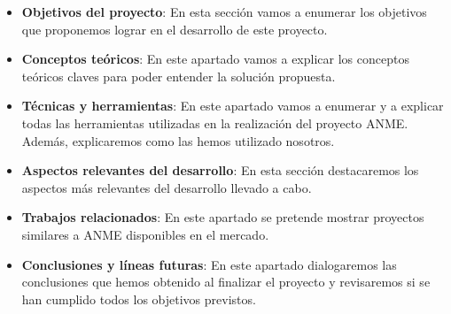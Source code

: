 \begin{itemize}
    \item \textbf{Objetivos del proyecto}: En esta sección vamos a enumerar los objetivos que proponemos lograr en el desarrollo de este proyecto.
    \item \textbf{Conceptos teóricos}: En este apartado vamos a explicar los conceptos teóricos claves para poder entender la solución propuesta.
    \item \textbf{Técnicas y herramientas}: En este apartado vamos a enumerar y a explicar todas las herramientas utilizadas en la realización del proyecto ANME. Además, explicaremos como las hemos utilizado nosotros. 
    \item \textbf{Aspectos relevantes del desarrollo}: En esta sección destacaremos los aspectos más relevantes del desarrollo llevado a cabo.
    \item \textbf{Trabajos relacionados}: En este apartado se pretende mostrar proyectos similares a ANME disponibles en el mercado.
    \item \textbf{Conclusiones y líneas futuras}: En este apartado dialogaremos las conclusiones que hemos obtenido al finalizar el proyecto y revisaremos si se han cumplido todos los objetivos previstos. 
\end{itemize}

